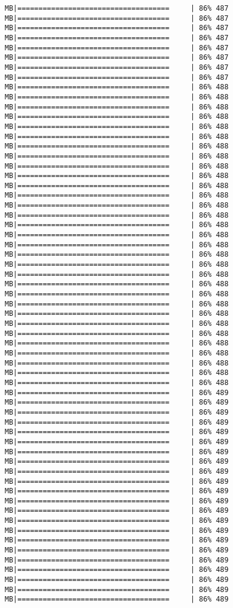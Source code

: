 \documentclass[
]{article}
\begin{document}
\begin{verbatim}
MB|====================================     | 86% 487 MB|====================================     | 86% 487 MB|====================================     | 86% 487 MB|====================================     | 86% 487 MB|====================================     | 86% 487 MB|====================================     | 86% 487 MB|====================================     | 86% 487 MB|====================================     | 86% 487 MB|====================================     | 86% 488 MB|====================================     | 86% 488 MB|====================================     | 86% 488 MB|====================================     | 86% 488 MB|====================================     | 86% 488 MB|====================================     | 86% 488 MB|====================================     | 86% 488 MB|====================================     | 86% 488 MB|====================================     | 86% 488 MB|====================================     | 86% 488 MB|====================================     | 86% 488 MB|====================================     | 86% 488 MB|====================================     | 86% 488 MB|====================================     | 86% 488 MB|====================================     | 86% 488 MB|====================================     | 86% 488 MB|====================================     | 86% 488 MB|====================================     | 86% 488 MB|====================================     | 86% 488 MB|====================================     | 86% 488 MB|====================================     | 86% 488 MB|====================================     | 86% 488 MB|====================================     | 86% 488 MB|====================================     | 86% 488 MB|====================================     | 86% 488 MB|====================================     | 86% 488 MB|====================================     | 86% 488 MB|====================================     | 86% 488 MB|====================================     | 86% 488 MB|====================================     | 86% 488 MB|====================================     | 86% 488 MB|====================================     | 86% 489 MB|====================================     | 86% 489 MB|====================================     | 86% 489 MB|====================================     | 86% 489 MB|====================================     | 86% 489 MB|====================================     | 86% 489 MB|====================================     | 86% 489 MB|====================================     | 86% 489 MB|====================================     | 86% 489 MB|====================================     | 86% 489 MB|====================================     | 86% 489 MB|====================================     | 86% 489 MB|====================================     | 86% 489 MB|====================================     | 86% 489 MB|====================================     | 86% 489 MB|====================================     | 86% 489 MB|====================================     | 86% 489 MB|====================================     | 86% 489 MB|====================================     | 86% 489 MB|====================================     | 86% 489 MB|====================================     | 86% 489 MB|====================================     | 86% 489 
\end{verbatim}
\end{document}
